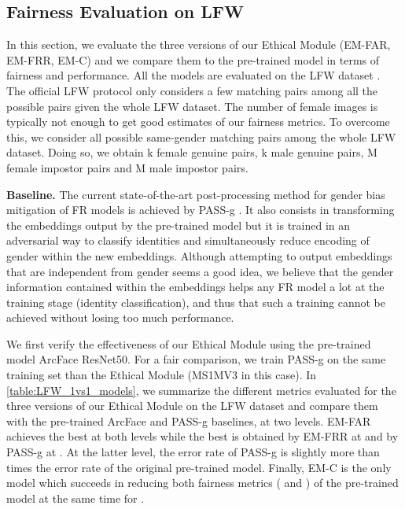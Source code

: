 \documentclass[nohyperref]{article}
\theoremstyle{plain}
\theoremstyle{definition}
\theoremstyle{remark}
\begin{document}
\subsection{Fairness Evaluation on LFW}

In this section, we evaluate the three versions of our Ethical Module (EM-FAR, EM-FRR, EM-C) and we compare them to the pre-trained model in terms of fairness and performance. All the models are evaluated on the LFW dataset \cite{LFW_dataset}. The official LFW protocol only considers a few matching pairs among all the possible pairs given the whole LFW dataset. The number of female images is typically not enough to get good estimates of our fairness metrics. To overcome this, we consider all possible same-gender matching pairs among the whole LFW dataset. Doing so, we obtain k female genuine pairs, k male genuine pairs, M female impostor pairs and M male impostor pairs.





{\bf Baseline.} The current state-of-the-art post-processing method for gender bias mitigation of FR models is achieved by PASS-g \cite{dhar2021pass}. It also consists in transforming the embeddings output by the pre-trained model but it is trained in an adversarial way to classify identities and simultaneously reduce encoding of gender within the new embeddings. Although attempting to output embeddings that are independent from gender seems a good idea, we believe that the gender information contained within the embeddings helps any FR model a lot at the training stage (identity classification), and thus that such a training cannot be achieved without losing too much performance.

We first verify the effectiveness of our Ethical Module using the pre-trained model ArcFace ResNet50. For a fair comparison, we train PASS-g on the same training set than the Ethical Module (MS1MV3 in this case). In \autoref{table:LFW_1vs1_models}, we summarize the different metrics evaluated for the three versions of our Ethical Module on the LFW dataset and compare them with the pre-trained ArcFace and PASS-g baselines, at two  levels. EM-FAR achieves the best  at both  levels while the best  is obtained by EM-FRR at  and by PASS-g at . At the latter  level, the error rate  of PASS-g is slightly more than  times the error rate of the original pre-trained model. Finally, EM-C is the only model which succeeds in reducing both fairness metrics ( and ) of the pre-trained model at the same time for  .
\end{document}
